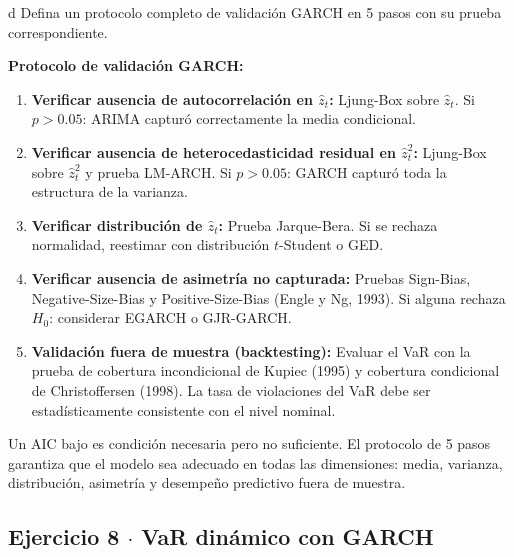 \documentclass[11pt,a4paper]{article}
\begin{document}
\begin{cajaInciso}{d}
Defina un protocolo completo de validación GARCH en 5 pasos con su prueba correspondiente.
\end{cajaInciso}

\textbf{Protocolo de validación GARCH:}

\begin{enumerate}[leftmargin=*, label=\textbf{Paso \arabic*.}]
  \item \textbf{Verificar ausencia de autocorrelación en $\hat{z}_t$:} Ljung-Box sobre $\hat{z}_t$. Si $p>0.05$: ARIMA capturó correctamente la media condicional.
  \item \textbf{Verificar ausencia de heterocedasticidad residual en $\hat{z}_t^2$:} Ljung-Box sobre $\hat{z}_t^2$ y prueba LM-ARCH. Si $p>0.05$: GARCH capturó toda la estructura de la varianza.
  \item \textbf{Verificar distribución de $\hat{z}_t$:} Prueba Jarque-Bera. Si se rechaza normalidad, reestimar con distribución $t$-Student o GED.
  \item \textbf{Verificar ausencia de asimetría no capturada:} Pruebas Sign-Bias, Negative-Size-Bias y Positive-Size-Bias (Engle y Ng, 1993). Si alguna rechaza $H_0$: considerar EGARCH o GJR-GARCH.
  \item \textbf{Validación fuera de muestra (backtesting):} Evaluar el VaR con la prueba de cobertura incondicional de Kupiec (1995) y cobertura condicional de Christoffersen (1998). La tasa de violaciones del VaR debe ser estadísticamente consistente con el nivel nominal.
\end{enumerate}

\begin{cajaHallazgo}
Un AIC bajo es condición necesaria pero no suficiente. El protocolo de 5 pasos garantiza que el modelo sea adecuado en todas las dimensiones: media, varianza, distribución, asimetría y desempeño predictivo fuera de muestra.
\end{cajaHallazgo}

\subsection*{Ejercicio 8 \texorpdfstring{$\cdot$}{·} VaR dinámico con GARCH}
\end{document}
